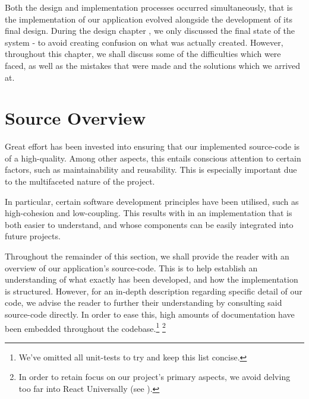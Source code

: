 \documentclass{standalone}
\begin{document}
	Both the design and implementation processes occurred simultaneously, that is the implementation of our application evolved alongside the development of its final design. During the design chapter , we only discussed the final state of the system - to avoid creating confusion on what was actually created. However, throughout this chapter, we shall discuss some of the difficulties which were faced, as well as the mistakes that were made and the solutions which we arrived at.

	\section{Source Overview}
		Great effort has been invested into ensuring that our implemented source-code is of a high-quality. Among other aspects, this entails conscious attention to certain factors, such as maintainability and reusability. This is especially important due to the multifaceted nature of the project.

		In particular, certain software development principles have been utilised, such as high-cohesion and low-coupling. This results with in an implementation that is both easier to understand, and whose components can be easily integrated into future projects.

		Throughout the remainder of this section, we shall provide the reader with an overview of our application's source-code. This is to help establish an understanding of what exactly has been developed, and how the implementation is structured. However, for an in-depth description regarding specific detail of our code, we advise the reader to further their understanding by consulting said source-code directly. In order to ease this, high amounts of documentation have been embedded throughout the codebase.\footnote{We've omitted all unit-tests to try and keep this list concise.} \footnote{In order to retain focus on our project's primary aspects, we avoid delving too far into React Universally (see ).}
\end{document}
